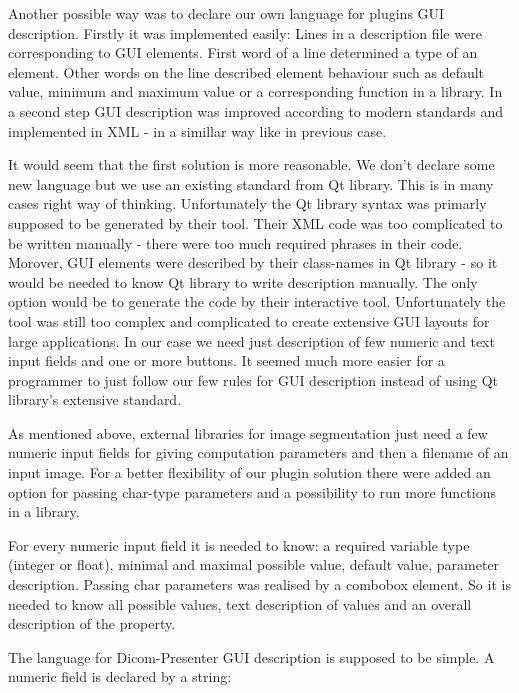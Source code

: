Another possible way was to declare our own language for plugins GUI description. Firstly it was implemented easily: Lines in a description file were corresponding to GUI elements. First word of a line determined a type of an element. Other words on the line described element behaviour such as default value, minimum and maximum value or a corresponding function in a library. In a second step GUI description was improved according to modern standards and implemented in XML - in a simillar way like in previous case.

It would seem that the first solution is more reasonable. We don't declare some new language but we use an existing standard from Qt library. This is in many cases right way of thinking. Unfortunately the Qt library syntax was primarly supposed to be generated by their tool. Their XML code was too complicated to be written manually - there were too much required phrases in their code. Morover, GUI elements were described by their class-names in Qt library - so it would be needed to know Qt library to write description manually. The only option would be to generate the code by their interactive tool. Unfortunately the tool was still too complex and complicated to create extensive GUI layouts for large applications. In our case we need just description of few numeric and text input fields and one or more buttons. It seemed much more easier for a programmer to just follow our few rules for GUI description instead of using Qt library's extensive standard.

As mentioned above, external libraries for image segmentation just need a few numeric input fields for giving computation parameters and then a filename of an input image. For a better flexibility of our plugin solution there were added an option for passing char-type parameters and a possibility to run more functions in a library.

For every numeric input field it is needed to know: a required variable type (integer or float), minimal and maximal possible value, default value, parameter description. Passing char parameters was realised by a combobox element. So it is needed to know all possible values, text description of values and an overall description of the property. 

The language for Dicom-Presenter GUI description is supposed to be simple. A numeric field is declared by a string:


